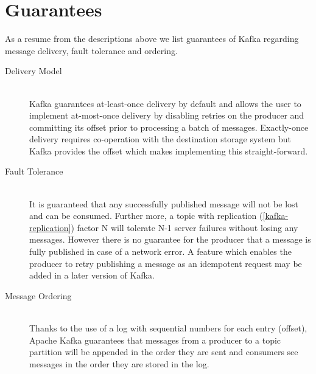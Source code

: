 \section{Guarantees}
\label{kafka-guarantees}
As a resume from the descriptions above we list guarantees of Kafka regarding
message delivery, fault tolerance and ordering. 

\begin{description}

\item[Delivery Model] \hfill \\
    Kafka guarantees at-least-once delivery by default and allows the user to
    implement at-most-once delivery by disabling retries on the producer and
    committing its offset prior to processing a batch of messages. Exactly-once
    delivery requires co-operation with the destination storage system but Kafka
    provides the offset which makes implementing this
    straight-forward.\cite{apachekafka}

\item[Fault Tolerance] \hfill \\
    It is guaranteed that any successfully published message will not be lost
    and can be consumed. Further more, a topic with replication
    (\ref{kafka-replication}) factor N will tolerate N-1 server failures without
    losing any messages. However there is no guarantee for the producer that
    a message is fully published in case of a network error. A feature which
    enables the producer to retry publishing a message as an idempotent
    request may be added in a later version of Kafka. \cite{apachekafka}

\item[Message Ordering] \hfill \\
    Thanks to the use of a log with sequential numbers for each entry (offset),
    Apache Kafka guarantees that messages from a producer to a topic partition
    will be appended in the order they are sent and consumers see messages
    in the order they are stored in the log. \cite{apachekafka}

\end{description}

